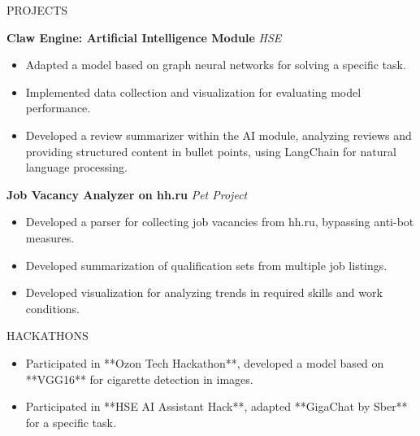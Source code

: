 \documentclass{resume}
\begin{document}
\begin{rSection}{PROJECTS}

\textbf{Claw Engine: Artificial Intelligence Module}  
\textit{HSE}  
\begin{itemize}
    \itemsep -3pt {} 
    \item Adapted a model based on graph neural networks for solving a specific task.
    \item Implemented data collection and visualization for evaluating model performance.
    \item Developed a review summarizer within the AI module, analyzing reviews and providing structured content in bullet points, using LangChain for natural language processing.
\end{itemize}

\textbf{Job Vacancy Analyzer on hh.ru}  
\textit{Pet Project}  
\begin{itemize}
    \itemsep -3pt {} 
    \item Developed a parser for collecting job vacancies from hh.ru, bypassing anti-bot measures.
    \item Developed summarization of qualification sets from multiple job listings.
    \item Developed visualization for analyzing trends in required skills and work conditions.
\end{itemize}

\end{rSection}

\begin{rSection}{HACKATHONS}
\begin{itemize}
    \itemsep -3pt {} 
    \item Participated in **Ozon Tech Hackathon**, developed a model based on **VGG16** for cigarette detection in images.
    \item Participated in **HSE AI Assistant Hack**, adapted **GigaChat by Sber** for a specific task.
\end{itemize}
\end{rSection}
\end{document}
